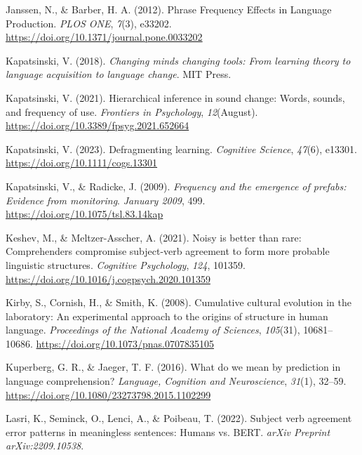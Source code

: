 \documentclass[
  12pt,
  letterpaper,
]{scrreprt}
\newlength{\cslhangindent}
\newenvironment{CSLReferences}[2] %
 {\begin{list}{}{%
  \setlength{\itemindent}{0pt}
  \setlength{\leftmargin}{0pt}
  \setlength{\parsep}{0pt}
  \ifodd #1
   \setlength{\leftmargin}{\cslhangindent}
   \setlength{\itemindent}{-1\cslhangindent}
  \fi
  \setlength{\itemsep}{#2\baselineskip}}}
 {\end{list}}
\begin{document}
\begin{CSLReferences}{1}{0}
Janssen, N., \& Barber, H. A. (2012). Phrase Frequency Effects in
Language Production. \emph{PLOS ONE}, \emph{7}(3), e33202.
\url{https://doi.org/10.1371/journal.pone.0033202}

Kapatsinski, V. (2018). \emph{Changing minds changing tools: From
learning theory to language acquisition to language change}. MIT Press.

Kapatsinski, V. (2021). Hierarchical inference in sound change: Words,
sounds, and frequency of use. \emph{Frontiers in Psychology},
\emph{12}(August). \url{https://doi.org/10.3389/fpsyg.2021.652664}

Kapatsinski, V. (2023). Defragmenting learning. \emph{Cognitive
Science}, \emph{47}(6), e13301. \url{https://doi.org/10.1111/cogs.13301}

Kapatsinski, V., \& Radicke, J. (2009). \emph{Frequency and the
emergence of prefabs: Evidence from monitoring}. \emph{January 2009},
499. \url{https://doi.org/10.1075/tsl.83.14kap}

Keshev, M., \& Meltzer-Asscher, A. (2021). Noisy is better than rare:
Comprehenders compromise subject-verb agreement to form more probable
linguistic structures. \emph{Cognitive Psychology}, \emph{124}, 101359.
\url{https://doi.org/10.1016/j.cogpsych.2020.101359}

Kirby, S., Cornish, H., \& Smith, K. (2008). Cumulative cultural
evolution in the laboratory: An experimental approach to the origins of
structure in human language. \emph{Proceedings of the National Academy
of Sciences}, \emph{105}(31), 10681--10686.
\url{https://doi.org/10.1073/pnas.0707835105}

Kuperberg, G. R., \& Jaeger, T. F. (2016). What do we mean by prediction
in language comprehension? \emph{Language, Cognition and Neuroscience},
\emph{31}(1), 32--59.
\url{https://doi.org/10.1080/23273798.2015.1102299}

Lasri, K., Seminck, O., Lenci, A., \& Poibeau, T. (2022). Subject verb
agreement error patterns in meaningless sentences: Humans vs. BERT.
\emph{arXiv Preprint arXiv:2209.10538}.


\end{CSLReferences}
\end{document}
